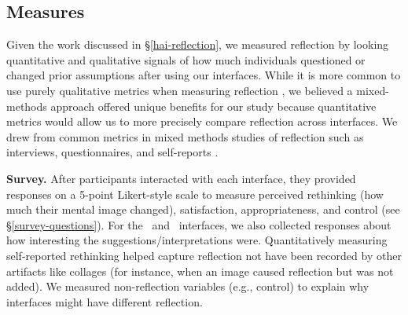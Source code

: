 \subsection{Measures}
\label{measures}

Given the work discussed in \S\ref{hai-reflection},
we measured reflection by looking quantitative and qualitative signals of how much individuals questioned or changed prior assumptions after using our interfaces. 
While it is more common to use purely qualitative metrics when measuring reflection \cite{bentvelzenetal2022revisitingreflection}, we believed a mixed-methods approach offered unique benefits for our study because quantitative metrics would allow us to more precisely compare reflection across interfaces.  
We drew from common metrics in mixed methods studies of reflection such as interviews, questionnaires, and self-reports \cite{bentvelzenetal2022revisitingreflection}. 

\textbf{Survey.}
After participants interacted with each interface, they provided responses on a 5-point Likert-style scale
to measure perceived rethinking (how much their mental image changed), satisfaction, appropriateness, and control (see \S\ref{survey-questions}). 
For the ~and \agonistic~interfaces, we also collected responses about how interesting the suggestions/interpretations were.
Quantitatively measuring self-reported rethinking helped capture reflection not have been recorded by other artifacts like collages (for instance, when an image caused reflection but was not added). 
We measured non-reflection variables (e.g., control) to explain why interfaces might have different reflection.

